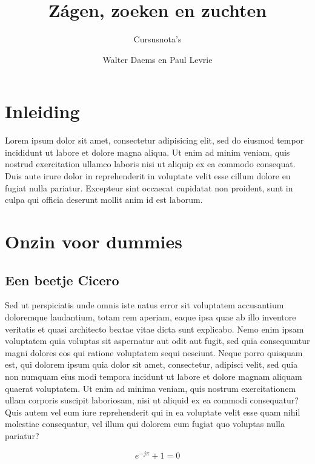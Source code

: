 \documentclass[a4paper,11pt,oneside,openright,english,qr]{uacoursetext}
\title{Z\'agen, zoeken en zuchten}
\subtitle{Cursusnota's}
\author{Walter Daems en Paul Levrie}
\begin{document}

\maketitle

\frontmatter

\tableofcontents

\mainmatter
\chapter*{Inleiding}
Lorem ipsum dolor sit amet, consectetur adipisicing elit, sed do
eiusmod tempor incididunt ut labore et dolore magna aliqua. Ut enim ad
minim veniam, quis nostrud exercitation ullamco laboris nisi ut
aliquip ex ea commodo consequat. Duis aute irure dolor in
reprehenderit in voluptate velit esse cillum dolore eu fugiat nulla
pariatur. Excepteur sint occaecat cupidatat non proident, sunt in
culpa qui officia deserunt mollit anim id est laborum.

\chapter{Onzin voor dummies}

\section{Een beetje Cicero}
Sed ut perspiciatis unde omnis iste natus error sit voluptatem
accusantium doloremque laudantium, totam rem aperiam, eaque ipsa quae
ab illo inventore veritatis et quasi architecto beatae vitae dicta
sunt explicabo. Nemo enim ipsam voluptatem quia voluptas sit
aspernatur aut odit aut fugit, sed quia consequuntur magni dolores eos
qui ratione voluptatem sequi nesciunt. Neque porro quisquam est, qui
dolorem ipsum quia dolor sit amet, consectetur, adipisci velit, sed
quia non numquam eius modi tempora incidunt ut labore et dolore magnam
aliquam quaerat voluptatem. Ut enim ad minima veniam, quis nostrum
exercitationem ullam corporis suscipit laboriosam, nisi ut aliquid ex
ea commodi consequatur? Quis autem vel eum iure reprehenderit qui in
ea voluptate velit esse quam nihil molestiae consequatur, vel illum
qui dolorem eum fugiat quo voluptas nulla pariatur?

\begin{equation}
  e^{-j\pi} + 1 = 0
\end{equation}
\end{document}
